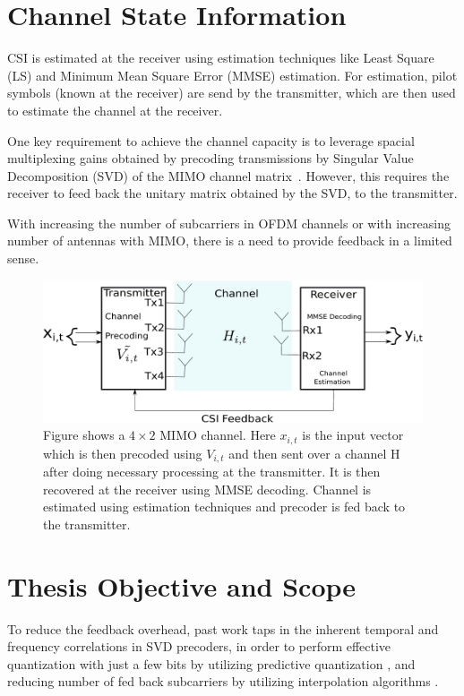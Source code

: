 \documentclass[11pt,a4paper]{report}
\begin{document}
\section{Channel State Information}     
CSI is estimated at the receiver using estimation techniques like Least Square (LS)
and Minimum Mean Square Error (MMSE) estimation. For estimation, pilot symbols
(known at the receiver) are send by the transmitter, which are then used to estimate
the channel at the receiver.

One key requirement to achieve the channel capacity is to leverage spacial multiplexing gains
obtained by precoding transmissions by Singular Value Decomposition (SVD) of the MIMO
channel matrix~\cite{love2008overview}. However, this requires the receiver to
feed back the unitary matrix obtained by the SVD, to the transmitter.

With increasing the number of subcarriers in OFDM channels or with 
increasing number of antennas with MIMO, there is a need to provide
feedback in a limited sense.

\begin{figure}
\begin{center}
\includegraphics[width=0.9\columnwidth]{images/drawing.pdf}
\caption{Figure shows a $4\times2$ MIMO channel. Here $x_{i,t}$ is the input vector
which is then precoded using $V_{i,t}$ and then sent over a channel H after
doing necessary processing at the transmitter. It is then recovered at the receiver using
MMSE decoding. Channel is estimated using estimation techniques and precoder is fed back to the
transmitter. }
\label{fig:mimo}
\end{center}
\end{figure}

\section{Thesis Objective and Scope}
To reduce the feedback overhead, past work taps in the inherent temporal and frequency correlations in SVD precoders, in order to perform effective quantization with just a few bits by utilizing predictive quantization \cite{Gupt1905:Predictive,6891198,7370793,sacristan2010differential,5946308,6545375,4114278,4556174}, and reducing number of fed back subcarriers by utilizing interpolation algorithms \cite{Gupt1905:Predictive,5671092,khaled2005quantized}.
\end{document}
